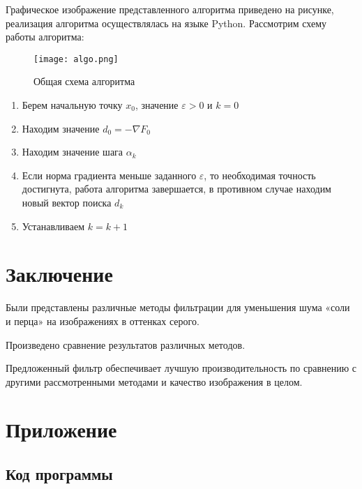 Графическое изображение представленного алгоритма приведено на рисунке,
реализация алгоритма осуществлялась на языке Python. Рассмотрим схему работы
алгоритма:

\begin{figure}[ht]
    \centering
    \texttt{[image: algo.png]}
    \caption{Общая схема алгоритма}
\end{figure}

\begin{enumerate}
    \item Берем начальную точку $x_{0}$, значение $\varepsilon > 0$ и $k=0$
    \item Находим значение $d_{0} = -\nabla F_{0}$ 
    \item Находим значение шага $\alpha_{k}$
    \item Если норма градиента меньше заданного $\varepsilon$, то необходимая
    точность достигнута, работа алгоритма завершается, в противном случае
    находим новый вектор поиска $d_{k}$
    \item Устанавливаем $k = k + 1$
\end{enumerate}

\newpage
\section{Заключение}

Были представлены различные методы фильтрации для уменьшения шума «соли и перца»
на изображениях в оттенках серого.

\noindent Произведено сравнение результатов различных методов.

\noindent Предложенный фильтр обеспечивает лучшую производительность по
сравнению с другими рассмотренными методами и качество изображения в целом.

\newpage
\nocite{*}
\printbibliography[heading=bibintoc]

\newpage
\section*{Приложение}

\subsection{Код программы}





